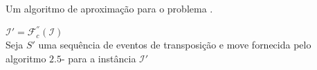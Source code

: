 \begin{algorithm}[!tbh]
  \caption{Um algoritmo de aproximação para o problema \SbFITM{}.\label{algorithm:UEBBPCAK}}
  $\mathcal{I}' = \mathcal{F}_{c}^{''}(\mathcal{I})$ \\
  Seja $S'$ uma sequência de eventos de transposição e move fornecida pelo algoritmo $2.5$-\SbITM{} para a instância $\mathcal{I}'$ \\
\end{algorithm}